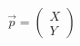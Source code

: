 \documentclass[preview]{standalone}
\begin{document}
\begin{align*}
\vec{p} = \begin{pmatrix} X \\ Y \end{pmatrix}
\end{align*}
\end{document}

